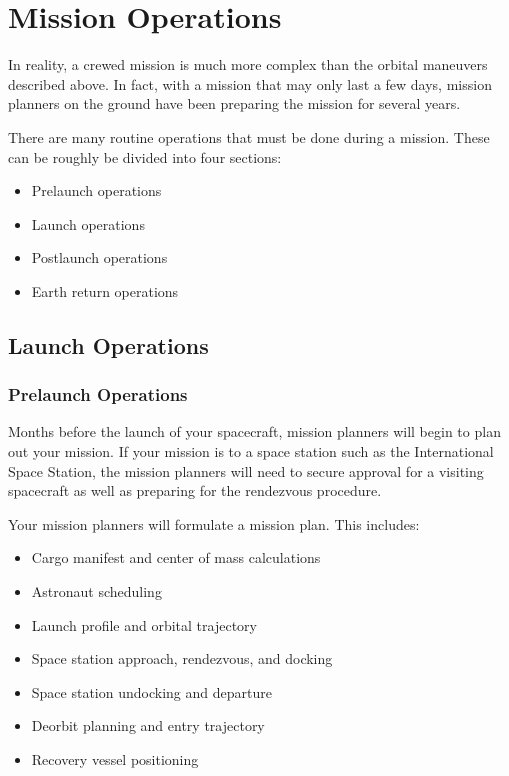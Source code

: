 
\chapter{Mission Operations}

\afterchapter

In reality, a crewed mission is much more complex than the orbital
maneuvers described above. In fact, with a mission that may only last
a few days, mission planners on the ground have been preparing the
mission for several years.

There are many routine operations that must be done during a
mission. These can be roughly be divided into four sections:

\begin{itemize}
\item Prelaunch operations
\item Launch operations
\item Postlaunch operations
\item Earth return operations
\end{itemize}

\section{Launch Operations}

\subsection{Prelaunch Operations}

Months before the launch of your spacecraft, mission planners will begin to plan out your mission. If your mission is to a space station such as the International Space Station, the mission planners will need to secure approval for a visiting spacecraft as well as preparing for the rendezvous procedure.

Your mission planners will formulate a mission plan. This includes:

\begin{itemize}
\item Cargo manifest and center of mass calculations
\item Astronaut scheduling
\item Launch profile and orbital trajectory
\item Space station approach, rendezvous, and docking
\item Space station undocking and departure
\item Deorbit planning and entry trajectory
\item Recovery vessel positioning
\end{itemize}

